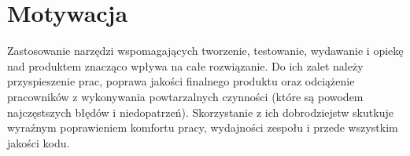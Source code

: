 \section{Motywacja}


Zastosowanie narzędzi wspomagających tworzenie, testowanie, wydawanie i opiekę nad produktem znacząco wpływa na całe rozwiązanie.
Do ich zalet należy przyspieszenie prac, poprawa jakości finalnego produktu oraz odciążenie pracowników z wykonywania powtarzalnych czynności 
(które są powodem \\najczęstszych błędów i niedopatrzeń).
Skorzystanie z ich dobrodziejstw skutkuje wyraźnym poprawieniem komfortu pracy, wydajności zespołu i przede wszystkim jakości kodu.
